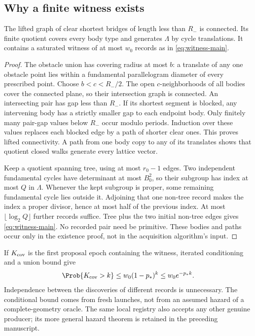 \subsection{Why a finite witness exists}
\begin{lemma}
\label{lem:witness}
The lifted graph of clear shortest bridges of length less than $R_-$ is
connected. Its finite quotient covers every body type and generates
$\Lambda$ by cycle translations. It contains a saturated witness of at
most $w_0$ records as in \eqref{eq:witness-main}.
\end{lemma}
\begin{proof}
The obstacle union has covering radius at most $b$: a translate of any
one obstacle point lies within a fundamental parallelogram diameter of
every prescribed point. Choose $b<c<R_-/2$. The open $c$-neighborhoods
of all bodies cover the connected plane, so their intersection graph is
connected. An intersecting pair has gap less than $R_-$. If its shortest
segment is blocked, any intervening body has a strictly smaller gap to
each endpoint body. Only finitely many pair-gap values below $R_-$ occur
modulo periods. Induction over these values replaces each blocked edge
by a path of shorter clear ones. This proves lifted connectivity.
A path from one body copy to any of its translates shows that quotient
closed walks generate every lattice vector.

Keep a quotient spanning tree, using at most $r_0-1$ edges. Two
independent fundamental cycles have determinant at most $B_0^2$, so
their subgroup has index at most $Q$ in $\Lambda$. Whenever the kept
subgroup is proper, some remaining fundamental cycle lies outside it.
Adjoining that one non-tree record makes the index a proper divisor,
hence at most half of the previous index. At most
$\lfloor\log_2 Q\rfloor$ further records suffice. Tree plus the two
initial non-tree edges gives \eqref{eq:witness-main}. No recorded pair
need be primitive. These bodies and paths occur only in the existence
proof, not in the acquisition algorithm's input.
\end{proof}

If $K_{\rm cov}$ is the first proposal epoch containing the witness,
iterated conditioning and a union bound give
\begin{equation}\label{eq:coupon}
 \Prob\{K_{\rm cov}>k\}\le w_0(1-p_*)^k\le w_0e^{-p_*k}.
\end{equation}
Independence between the discoveries of different records is unnecessary.
The conditional bound comes from fresh launches, not from an assumed
hazard of a complete-geometry oracle. The same local registry also accepts
any other genuine producer; its more general hazard theorem is retained
in the preceding manuscript.
